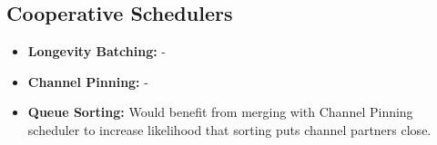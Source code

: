 \subsection{Cooperative Schedulers}

\begin{slide}
    \begin{itemize}
        \item {\bf Longevity Batching:} -  
        \item {\bf Channel Pinning:} -  
        \item {\bf Queue Sorting:} Would benefit from merging with
            Channel Pinning scheduler to increase likelihood that
            sorting puts channel partners close. 
    \end{itemize}

\end{slide}

